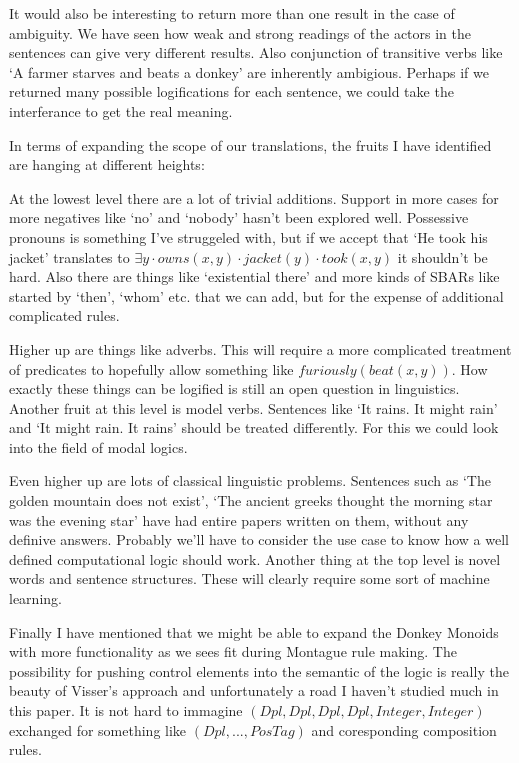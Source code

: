 \documentclass[12pt]{article}
\begin{document}
It would also be interesting to return more than one result in the case of ambiguity. We have seen how weak and strong readings of the actors in the sentences can give very different results. Also conjunction of transitive verbs like `A farmer starves and beats a donkey' are inherently ambigious. Perhaps if we returned many possible logifications for each sentence, we could take the interferance to get the real meaning.

In terms of expanding the scope of our translations, the fruits I have identified are hanging at different heights:

At the lowest level there are a lot of trivial additions. Support in more cases for more negatives like `no' and `nobody' hasn't been explored well. Possessive pronouns is something I've struggeled with, but if we accept that `He took his jacket' translates to $\exists y\cdot owns(x,y)\cdot jacket(y)\cdot took(x,y)$ it shouldn't be hard. Also there are things like `existential there' and more kinds of SBARs like started by `then', `whom' etc. that we can add, but for the expense of additional complicated rules.

Higher up are things like adverbs. This will require a more complicated treatment of predicates to hopefully allow something like $furiously(beat(x,y))$. How exactly these things can be logified is still an open question in linguistics. Another fruit at this level is model verbs. Sentences like `It rains. It might rain' and `It might rain. It rains' should be treated differently. For this we could look into the field of modal logics.

Even higher up are lots of classical linguistic problems. Sentences such as `The golden mountain does not exist', `The ancient greeks thought the morning star was the evening star' have had entire papers written on them, without any definive answers. Probably we'll have to consider the use case to know how a well defined computational logic should work. Another thing at the top level is novel words and sentence structures. These will clearly require some sort of machine learning.

Finally I have mentioned that we might be able to expand the Donkey Monoids with more functionality as we sees fit during Montague rule making. The possibility for pushing control elements into the semantic of the logic is really the beauty of Visser's approach and unfortunately a road I haven't studied much in this paper. It is not hard to immagine $(Dpl,Dpl,Dpl,Dpl,Integer,Integer)$ exchanged for something like $(Dpl,...,PosTag)$ and coresponding composition rules.
\end{document}
